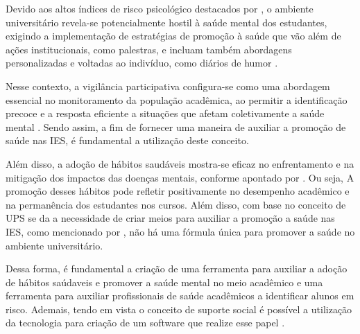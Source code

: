 




Devido aos altos índices de risco psicológico destacados por , o ambiente universitário revela-se potencialmente hostil à saúde mental dos estudantes, exigindo a implementação de estratégias de promoção à saúde que vão além de ações institucionais, como palestras, e incluam também abordagens personalizadas e voltadas ao indivíduo, como diários de humor \cite{schueller_2019}.

Nesse contexto, a vigilância participativa configura-se como uma abordagem essencial no monitoramento da população acadêmica, ao permitir a identificação precoce e a resposta eficiente a situações que afetam coletivamente a saúde mental \cite{lealneto2016digital}. Sendo assim, a fim de fornecer uma maneira de auxiliar a promoção de saúde nas IES, é fundamental a utilização deste conceito.

\vspace{23em}

Além disso, a adoção de hábitos saudáveis mostra-se eficaz no enfrentamento e na mitigação dos impactos das doenças mentais, conforme apontado por . Ou seja, A promoção desses hábitos pode refletir positivamente no desempenho acadêmico e na permanência dos estudantes nos cursos. Além disso, com base no conceito de UPS se da a necessidade de criar meios para auxiliar a promoção a saúde nas IES, como mencionado por , não há uma fórmula única para promover a saúde no ambiente universitário.

Dessa forma, é fundamental a criação de uma ferramenta para auxiliar a adoção de hábitos saúdaveis e promover a saúde mental no meio acadêmico e uma ferramenta para auxiliar profissionais de saúde acadêmicos a identificar alunos em risco. Ademais, tendo em vista o conceito de suporte social é possível a utilização da tecnologia para criação de um software que realize esse papel \cite{siqueira_construcao_2008}. 

